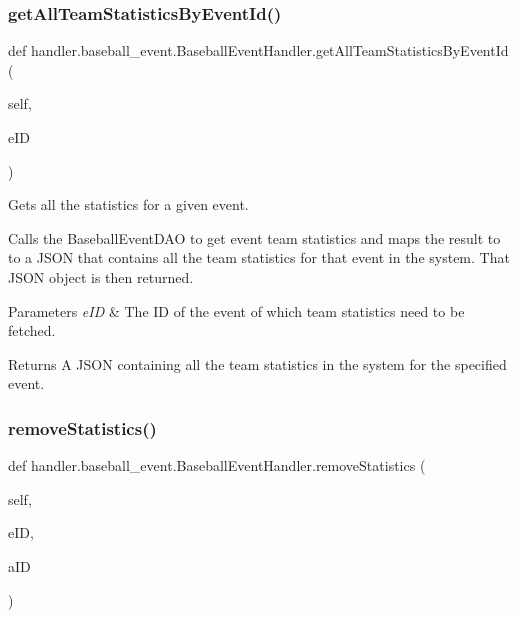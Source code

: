 \subsubsection{\texorpdfstring{get\+All\+Team\+Statistics\+By\+Event\+Id()}{getAllTeamStatisticsByEventId()}}
{\footnotesize\ttfamily def handler.\+baseball\+\_\+event.\+Baseball\+Event\+Handler.\+get\+All\+Team\+Statistics\+By\+Event\+Id (\begin{DoxyParamCaption}\item[{}]{self,  }\item[{}]{e\+ID }\end{DoxyParamCaption})}



Gets all the statistics for a given event. 

Calls the Baseball\+Event\+D\+AO to get event team statistics and maps the result to to a J\+S\+ON that contains all the team statistics for that event in the system. That J\+S\+ON object is then returned.


\begin{DoxyParams}{Parameters}
{\em e\+ID} & The ID of the event of which team statistics need to be fetched.\\
\hline
\end{DoxyParams}
\begin{DoxyReturn}{Returns}
A J\+S\+ON containing all the team statistics in the system for the specified event. 
\end{DoxyReturn}
\mbox{\label{classhandler_1_1baseball__event_1_1_baseball_event_handler_ae6bea47416a487c4e364890221f22b0c}} 
\subsubsection{\texorpdfstring{remove\+Statistics()}{removeStatistics()}}
{\footnotesize\ttfamily def handler.\+baseball\+\_\+event.\+Baseball\+Event\+Handler.\+remove\+Statistics (\begin{DoxyParamCaption}\item[{}]{self,  }\item[{}]{e\+ID,  }\item[{}]{a\+ID }\end{DoxyParamCaption})}



